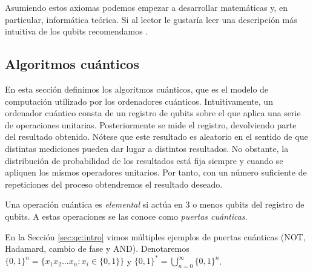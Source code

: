 \documentclass{article}
\begin{document}
Asumiendo estos axiomas podemos empezar a desarrollar matemáticas y, en particular, informática teórica. Si al lector le gustaría leer una descripción más intuitiva de los qubits recomendamos \cite[Capítulo 10]{algorithms}. 


\subsection{Algoritmos cuánticos}

En esta sección definimos los algoritmos cuánticos, que es el modelo de computación utilizado por los ordenadores cuánticos. Intuitivamente, un ordenador cuántico consta de un registro de qubits sobre el que aplica una serie de operaciones unitarias. Posteriormente se mide el registro, devolviendo parte del resultado obtenido. Nótese que este resultado es aleatorio en el sentido de que distintas mediciones pueden dar lugar a distintos resultados. No obstante, la distribución de probabilidad de los resultados está fija siempre y cuando se apliquen los mismos operadores unitarios. Por tanto, con un número suficiente de repeticiones del proceso obtendremos el resultado deseado. %

\begin{definition}
    Una operación cuántica es \emph{elemental} si actúa en $3$ o menos qubits del registro de qubits. A estas operaciones se las conoce como \emph{puertas cuánticas}.
\end{definition}

En la Sección \ref{sec:qc:intro} vimos múltiples ejemplos de puertas cuánticas (NOT, Hadamard, cambio de fase y AND). Denotaremos $\{0,1\}^n = \{x_1 x_2 \ldots x_n : x_i \in \{0,1\}\}$ y $\{0,1\}^* = \bigcup_{n = 0}^\infty \{0,1\}^n$.
\end{document}
